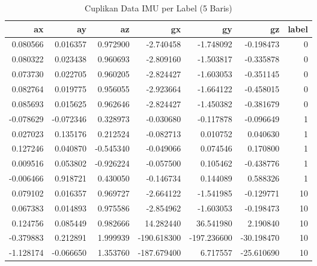 \begin{table}[htbp]
\centering
\begin{table}
\caption{Cuplikan Data IMU per Label (5 Baris)}
\label{tab:cuplikan_imu}
\begin{tabular}{rrrrrrr}
\toprule
ax & ay & az & gx & gy & gz & label \\
\midrule
0.080566 & 0.016357 & 0.972900 & -2.740458 & -1.748092 & -0.198473 & 0 \\
0.080322 & 0.023438 & 0.960693 & -2.809160 & -1.503817 & -0.335878 & 0 \\
0.073730 & 0.022705 & 0.960205 & -2.824427 & -1.603053 & -0.351145 & 0 \\
0.082764 & 0.019775 & 0.956055 & -2.923664 & -1.664122 & -0.458015 & 0 \\
0.085693 & 0.015625 & 0.962646 & -2.824427 & -1.450382 & -0.381679 & 0 \\
-0.078629 & -0.072346 & 0.328973 & -0.030680 & -0.117878 & -0.096649 & 1 \\
0.027023 & 0.135176 & 0.212524 & -0.082713 & 0.010752 & 0.040630 & 1 \\
0.127246 & 0.040870 & -0.545340 & -0.049066 & 0.074546 & 0.170800 & 1 \\
0.009516 & 0.053802 & -0.926224 & -0.057500 & 0.105462 & -0.438776 & 1 \\
-0.006466 & 0.918721 & 0.430050 & -0.146734 & 0.144089 & 0.588326 & 1 \\
0.079102 & 0.016357 & 0.969727 & -2.664122 & -1.541985 & -0.129771 & 10 \\
0.067383 & 0.014893 & 0.975586 & -2.854962 & -1.603053 & -0.198473 & 10 \\
0.124756 & 0.085449 & 0.982666 & 14.282440 & 36.541980 & 2.190840 & 10 \\
-0.379883 & 0.212891 & 1.999939 & -190.618300 & -197.236600 & -30.198470 & 10 \\
-1.128174 & -0.066650 & 1.353760 & -187.679400 & 6.717557 & -25.610690 & 10 \\
\bottomrule
\end{tabular}
\end{table}
\end{table}
